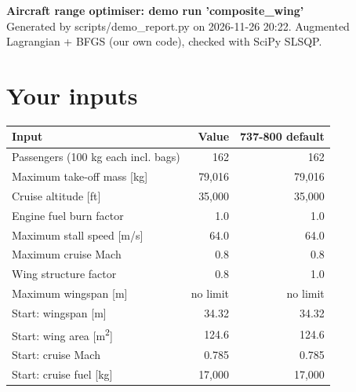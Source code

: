 \documentclass[10pt,a4paper]{article}
\begin{document}
\begin{center}{\Large\bfseries Aircraft range optimiser: demo run 'composite\_wing'}\\[4pt]
{\small Generated by scripts/demo\_report.py on 2026-11-26 20:22. Augmented Lagrangian + BFGS (our own code), checked with SciPy SLSQP.}\end{center}
\section{Your inputs}
\begin{table}[H]\centering\small
\begin{tabular}{lrr}
\toprule
\textbf{Input} & \textbf{Value} & \textbf{737-800 default} \\
\midrule
Passengers (100 kg each incl. bags) & 162 & 162 \\
Maximum take-off mass [kg] & 79,016 & 79,016 \\
Cruise altitude [ft] & 35,000 & 35,000 \\
Engine fuel burn factor & 1.0 & 1.0 \\
Maximum stall speed [m/s] & 64.0 & 64.0 \\
Maximum cruise Mach & 0.8 & 0.8 \\
Wing structure factor & 0.8 & 1.0 \\
Maximum wingspan [m] & no limit & no limit \\
Start: wingspan [m] & 34.32 & 34.32 \\
Start: wing area [m\textsuperscript{2}] & 124.6 & 124.6 \\
Start: cruise Mach & 0.785 & 0.785 \\
Start: cruise fuel [kg] & 17,000 & 17,000 \\
\bottomrule
\end{tabular}
\end{table}
\end{document}
